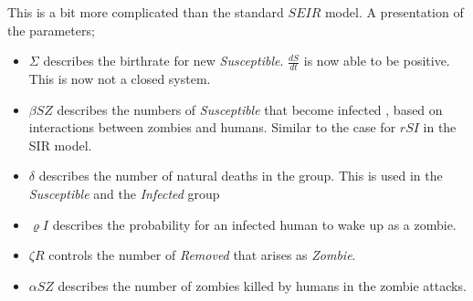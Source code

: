 \documentclass[%
twoside,                 %
final,                   %
10pt]{article}
\begin{document}
This is a bit more complicated than the standard $SEIR$ model. A presentation of the parameters;
\begin{itemize}
\item $\Sigma$ describes the birthrate for new \emph{Susceptible}. $\frac{dS}{dt}$ is now able to be positive. This is now not a closed system. 

\item $\beta SZ$ describes the numbers of \emph{Susceptible} that become infected , based on interactions between zombies and humans. Similar to the case for $rSI$ in the SIR model. 

\item $\delta$ describes the number of natural deaths in the group. This is used in the \emph{Susceptible} and the \emph{Infected} group

\item $\varrho I$ describes the probability for an infected human to wake up as a zombie.

\item $\zeta R$ controls the number of \emph{Removed} that arises as \emph{Zombie}. 

\item $\alpha SZ$ describes the number of zombies killed by humans in the zombie attacks. 
\end{itemize}

\noindent


\vspace{3mm}




\vspace{3mm}
\end{document}
